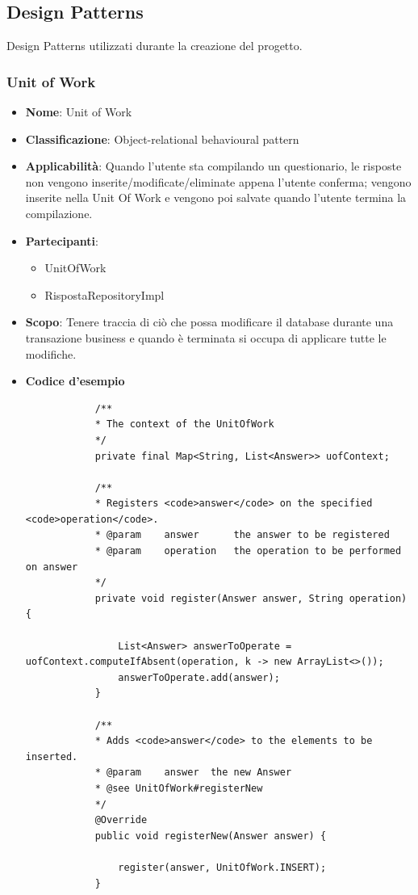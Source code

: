 \documentclass[12pt]{article}
\begin{document}
	\subsection{Design Patterns}
	Design Patterns utilizzati durante la creazione del progetto.
	\subsubsection{Unit of Work}
	\begin{itemize}
		\item \textbf{Nome}: Unit of Work
		\item \textbf{Classificazione}: Object-relational behavioural pattern
		\item \textbf{Applicabilità}: Quando l'utente sta compilando un questionario, le risposte non vengono inserite/modificate/eliminate appena l'utente conferma; vengono inserite nella Unit Of Work e vengono poi salvate quando l'utente termina la compilazione.
		\item \textbf{Partecipanti}:
		\begin{itemize}
			\item {UnitOfWork}
			\item {RispostaRepositoryImpl}
			
		\end{itemize}
		\item \textbf{Scopo}: Tenere traccia di ciò che possa modificare il database durante una transazione business e quando è terminata si occupa di applicare tutte le modifiche.
		\item \textbf{Codice d'esempio}
		\begin{lstlisting}
			/**
			* The context of the UnitOfWork
			*/
			private final Map<String, List<Answer>> uofContext;
			
			/**
			* Registers <code>answer</code> on the specified <code>operation</code>.
			* @param	answer		the answer to be registered
			* @param	operation	the operation to be performed on answer
			*/
			private void register(Answer answer, String operation) {
				
				List<Answer> answerToOperate = uofContext.computeIfAbsent(operation, k -> new ArrayList<>());
				answerToOperate.add(answer);
			}
			
			/**
			* Adds <code>answer</code> to the elements to be inserted.
			* @param	answer	the new Answer
			* @see UnitOfWork#registerNew
			*/
			@Override
			public void registerNew(Answer answer) {
				
				register(answer, UnitOfWork.INSERT);
			}
			

\end{lstlisting}
\end{itemize}
\end{document}
